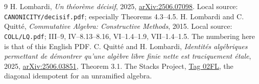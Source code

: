 \documentclass[11pt]{article}
\begin{document}
\begin{thebibliography}{9}
 H. Lombardi, \emph{Un th\'eor\`eme d\'ecisif},
2025, \href{https://arxiv.org/abs/2506.07098}{arXiv:2506.07098}.
Local source: \texttt{CANONICITY/decisif.pdf}; especially Theorems 4.3--4.5.
 H. Lombardi and C. Quitt\'e,
\emph{Commutative Algebra: Constructive Methods}, 2015.
Local source: \texttt{COLL/LQ.pdf}; III--9, IV--8.13--8.16,
VI--1.4--1.9, VII--1.4--1.5.  The numbering here is that of this
English PDF.
 C. Quitt\'e and H. Lombardi,
\emph{Identit\'es alg\'ebriques permettant de d\'emontrer qu'une
alg\`ebre libre finie nette est traciquement \'etale}, 2025,
\href{https://arxiv.org/abs/2506.03851}{arXiv:2506.03851}, Theorem 3.1.
 The Stacks Project,
\href{https://stacks.math.columbia.edu/tag/02FL}{Tag 02FL},
the diagonal idempotent for an unramified algebra.
\end{thebibliography}
\end{document}
